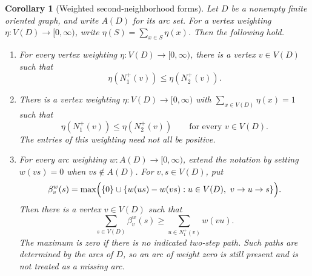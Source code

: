 \documentclass[11pt]{article}
\newtheorem{corollary}[theorem]{Corollary}
\theoremstyle{remark}
\begin{document}
\begin{corollary}[Weighted second-neighborhood forms]\label{cor:weighted-forms}
Let \(D\) be a nonempty finite oriented graph, and write \(A(D)\) for its
arc set. For a vertex weighting \(\eta:V(D)\to[0,\infty)\), write
\(\eta(S)=\sum_{x\in S}\eta(x)\). Then the following hold.
\begin{enumerate}[label=\textup{(\roman*)}]
\item For every vertex weighting \(\eta:V(D)\to[0,\infty)\), there is a
vertex \(v\in V(D)\) such that
\[
 \eta(N_1^+(v))\leq\eta(N_2^+(v)).
\]

\item There is a vertex weighting \(\eta:V(D)\to[0,\infty)\) with
\(\sum_{x\in V(D)}\eta(x)=1\) such that
\[
 \eta(N_1^+(v))\leq\eta(N_2^+(v))\qquad\text{for every }v\in V(D).
\]
The entries of this weighting need not all be positive.

\item For every arc weighting \(w:A(D)\to[0,\infty)\), extend the notation
by setting \(w(vs)=0\) when \(vs\notin A(D)\). For \(v,s\in V(D)\), put
\[
 \beta_v^w(s)=\max\Bigl(\{0\}\cup
 \{w(us)-w(vs):u\in V(D),\ v\to u\to s\}\Bigr).
\]
Then there is a vertex \(v\in V(D)\) such that
\[
 \sum_{s\in V(D)}\beta_v^w(s)
 \geq \sum_{u\in N_1^+(v)}w(vu).
\]
The maximum is zero if there is no indicated two-step path. Such paths
are determined by the arcs of \(D\), so an arc of weight zero is still
present and is not treated as a missing arc.
\end{enumerate}
\end{corollary}
\end{document}
